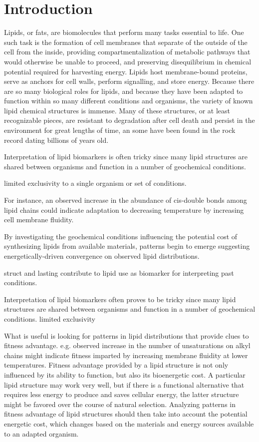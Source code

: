 \chapter{Introduction}


Lipids, or fats, are biomolecules that perform many tasks essential to life. One such task is the formation of cell membranes that separate of the outside of the cell from the inside, providing compartmentalization of metabolic pathways that would otherwise be unable to proceed, and preserving disequilibrium in chemical potential required for harvesting energy. Lipids host membrane-bound proteins, serve as anchors for cell walls, perform signalling, and store energy. Because there are so many biological roles for lipids, and because they have been adapted to function within so many different conditions and organisms, the variety of known lipid chemical structures is immense. Many of these structures, or at least recognizable pieces, are resistant to degradation after cell death and persist in the environment for great lengths of time, an some have been found in the rock record dating billions of years old.

Interpretation of lipid biomarkers is often tricky since many lipid structures are shared between organisms and function in a number of geochemical conditions.

limited exclusivity to a single organism or set of conditions.


For instance, an observed increase in the abundance of cis-double bonds among lipid chains could indicate adaptation to decreasing temperature by increasing cell membrane fluidity.


By investigating the geochemical conditions influencing the potential cost of synthesizing lipids from available materials, patterns begin to emerge suggesting energetically-driven convergence on observed lipid distributions. 


struct and lasting contribute to lipid use as biomarker for interpreting past conditions.

Interpretation of lipid biomarkers often proves to be tricky since many lipid structures are shared between organisms and function in a number of geochemical conditions. limited exclusivity 

What is useful is looking for patterns in lipid distributions that provide clues to fitness advantage. e.g. observed increase in the number of unsaturations on alkyl chains might indicate fitness imparted by increasing membrane fluidity at lower temperatures. Fitness advantage provided by a lipid structure is not only influenced by its ability to function, but also its bioenergetic cost. A particular lipid structure may work very well, but if there is a functional alternative that requires less energy to produce and saves cellular energy, the latter structure might be favored over the course of natural selection. Analyzing patterns in fitness advantage of lipid structures should then take into account the potential energetic cost, which changes based on the materials and energy sources available to an adapted organism.

